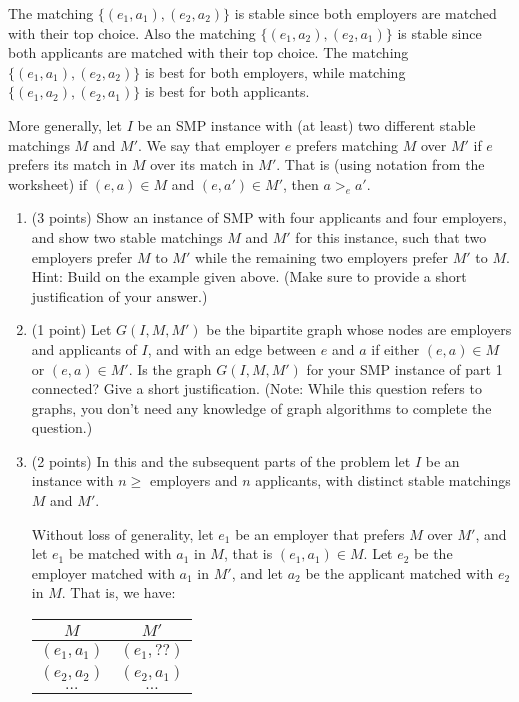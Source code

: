 \documentclass[11pt]{article}
\begin{document}
\vspace{.1in}

The matching $\{ (e_1,a_1),(e_2,a_2) \}$ is stable since both employers are
matched with their top choice.  Also the matching $\{ (e_1,a_2), (e_2,a_1) \}$
is stable since both applicants are matched with their top choice.
The matching $\{ (e_1,a_1),(e_2,a_2) \}$ is best for both employers,
while matching $\{ (e_1,a_2), (e_2,a_1) \}$ is best for both applicants.

More generally, let $I$ be an SMP instance with (at least) two
different stable matchings $M$ and $M'$. We say that employer $e$
prefers matching $M$ over $M'$ if $e$ prefers its match in $M$ over
its match in $M'$.  That is (using notation from the worksheet) if
$(e,a) \in M$ and $(e,a') \in M'$, then $a >_e a'$.

\begin{enumerate}
\item (3 points)
Show an instance of SMP with four applicants and four employers, and show two
stable matchings $M$ and $M'$ for this instance, such that two employers
prefer $M$ to $M'$ while the remaining two employers prefer $M'$ to $M$.
Hint: Build on the example given above.
(Make sure to provide a short justification of your answer.)

\item (1 point)
  Let $G(I,M,M')$ be the bipartite graph whose nodes are employers and applicants of $I$, and with an edge between $e$ and $a$ if either $(e,a) \in M$ or $(e,a) \in M'$. Is the graph $G(I,M,M')$ for your SMP instance of part 1 connected?
  Give a short justification. (Note: While this question refers to graphs, you don't need any knowledge of graph algorithms to complete the question.)

\item (2 points)
In this and the subsequent parts of the problem let $I$ be an instance with $n\ge $ employers and $n$ applicants, with distinct stable matchings $M$ and $M'$.

Without loss of generality, let $e_1$ be an employer that prefers $M$ over $M'$, and let $e_1$ be matched with $a_1$ in $M$, that is $(e_1,a_1) \in M$. Let $e_2$ be the employer matched with $a_1$ in $M'$, and let $a_2$ be the applicant matched with $e_2$ in $M$. That is, we have:

\vspace{.1in}

\begin{center}
\begin{tabular}{c|c}
$M$ & $M'$ \\ \hline
$(e_1,a_1)$ &  $(e_1, ??)$ \\
  $(e_2,a_2)$ & $(e_2,a_1)$ \\
  $\ldots$ & $\ldots$ \\
\end{tabular}
\end{center}


\end{enumerate}
\end{document}
